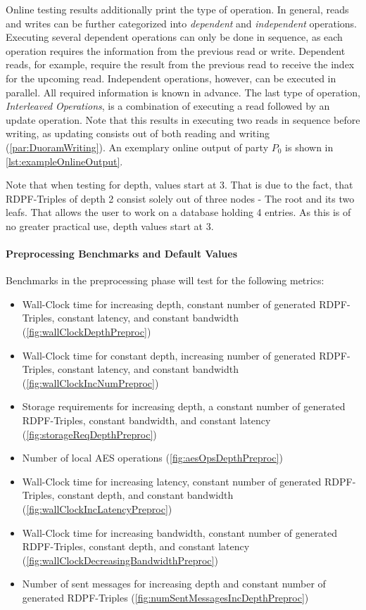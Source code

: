 Online testing results additionally print the type of operation.
In general, reads and writes can be further categorized into \textit{dependent} and \textit{independent} operations.
Executing several dependent operations can only be done in sequence, as each operation requires the information from the previous read or write.
Dependent reads, for example, require the result from the previous read to receive the index for the upcoming read.
Independent operations, however, can be executed in parallel.
All required information is known in advance.
The last type of operation, \textit{Interleaved Operations}, is a combination of executing a read followed by an update operation.
Note that this results in executing two reads in sequence before writing, as updating consists out of both reading and writing (\ref{par:DuoramWriting}). 
An exemplary online output of party $P_0$ is shown in \ref{lst:exampleOnlineOutput}.

Note that when testing for depth, values start at 3.
That is due to the fact, that RDPF-Triples of depth 2 consist solely out of three nodes - The root and its two leafs.
That allows the user to work on a database holding 4 entries.
As this is of no greater practical use, depth values start at 3.

\paragraph{Preprocessing Benchmarks and Default Values}\label{par:preprocBenchmarksNumbers}
Benchmarks in the preprocessing phase will test for the following metrics:
\begin{itemize}
    \item Wall-Clock time for increasing depth, constant number of generated RDPF-Triples, constant latency, and constant bandwidth (\ref{fig:wallClockDepthPreproc})
    \item Wall-Clock time for constant depth, increasing number of generated RDPF-Triples, constant latency, and constant bandwidth (\ref{fig:wallClockIncNumPreproc})
    \item Storage requirements for increasing depth, a constant number of generated RDPF-Triples, constant bandwidth, and constant latency (\ref{fig:storageReqDepthPreproc})
    \item Number of local AES operations (\ref{fig:aesOpsDepthPreproc})
    \item Wall-Clock time for increasing latency, constant number of generated RDPF-Triples, constant depth, and constant bandwidth (\ref{fig:wallClockIncLatencyPreproc})
    \item Wall-Clock time for increasing bandwidth, constant number of generated RDPF-Triples, constant depth, and constant latency (\ref{fig:wallClockDecreasingBandwidthPreproc})
    \item Number of sent messages for increasing depth and constant number of generated RDPF-Triples (\ref{fig:numSentMessagesIncDepthPreproc})
\end{itemize}


